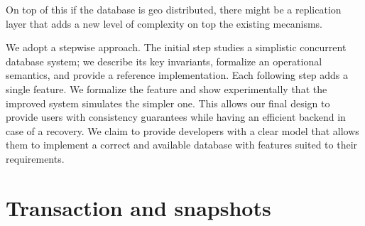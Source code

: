 \documentclass[parallelisme]{compas2022}
\begin{document}
On top of this if the database is geo distributed, there might be a replication layer that adds a new level of complexity on top the existing mecanisms.


We adopt a stepwise approach.
The initial step studies a simplistic concurrent database system; we describe its key invariants, formalize an operational semantics, and provide a reference implementation.
Each following step adds a single feature.
We formalize the feature and show experimentally that the improved system simulates the simpler one.
This allows our final design to provide users with consistency guarantees while having an efficient backend in case of a recovery.
We claim to provide developers with a clear model that allows them to implement a correct and available database with features suited to their requirements.





\section{Transaction and snapshots}
\end{document}
